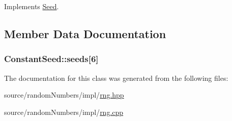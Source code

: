 Implements \hyperlink{classSeed_d07ddf0065c61a3dea72238a93e2bb35}{Seed}.

\subsection{Member Data Documentation}
\hypertarget{classConstantSeed_10cdd2d1933e1af94162477edcad0352}{
\subsubsection[{seeds}]{ {\bf ConstantSeed::seeds}\mbox{[}6\mbox{]}}}
\label{classConstantSeed_10cdd2d1933e1af94162477edcad0352}




The documentation for this class was generated from the following files:\begin{CompactItemize}
\item 
source/randomNumbers/impl/\hyperlink{rng_8hpp}{rng.hpp}\item 
source/randomNumbers/impl/\hyperlink{rng_8cpp}{rng.cpp}\end{CompactItemize}
